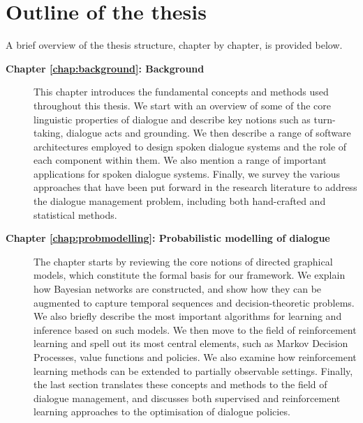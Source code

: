 
\section{Outline of the thesis}

A brief overview of the thesis structure, chapter by chapter, is provided below. 

\begin{description}
  \item[\textbf{Chapter \ref{chap:background}: Background}] \hfill  \vspace{2mm}
  
This chapter introduces the fundamental concepts and methods used throughout this thesis. We start with an overview of some of the core linguistic properties of dialogue and describe key notions such as turn-taking, dialogue acts and grounding.  We then describe a range of software architectures employed to design spoken dialogue systems and the role of each component within them.  We also mention a range of important applications for spoken dialogue systems. Finally, we survey the various approaches that have been put forward in the research literature to address the dialogue management problem, including both hand-crafted and statistical methods. \vspace{2mm}

  \item[\textbf{Chapter \ref{chap:probmodelling}: Probabilistic modelling of dialogue}] \hfill \vspace{2mm}

 The chapter starts by reviewing the core notions of directed graphical models, which constitute the formal basis for our framework.  We explain how Bayesian networks are constructed, and show how they can be augmented to capture temporal sequences and decision-theoretic problems. We also briefly describe the most important algorithms for learning and inference based on such models.  We then  move to the field of reinforcement learning and spell out its most central elements, such as Markov Decision Processes, value functions and policies. We also examine how reinforcement learning methods can be extended to partially observable settings.  Finally, the last section translates these concepts and methods to the field of dialogue management, and discusses both supervised and reinforcement learning approaches to the optimisation of dialogue policies.
 

\end{description}
